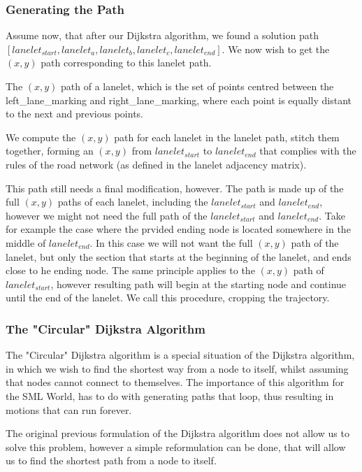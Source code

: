 \subsubsection{Generating the Path}

Assume now, that after our Dijkstra algorithm, we found a solution path $ [lanelet_{start},\allowbreak lanelet_{a},\allowbreak lanelet_{b},\allowbreak lanelet_{c},\allowbreak lanelet_{end}]$. We now wish to get the $(x,y)$ path corresponding to this lanelet path. 

The $(x,y)$ path of a lanelet, which is the set of points centred between the left\_lane\_marking and right\_lane\_marking, where each point is equally distant to the next and previous points.

We compute the $(x,y)$ path for each lanelet in the lanelet path, stitch them together, forming an $(x,y)$ from $lanelet_{start}$ to $lanelet_{end}$ that complies with the rules of the road network (as defined in the lanelet adjacency matrix).

This path still needs a final modification, however. The path is made up of the full $(x,y)$ paths of each lanelet, including the $lanelet_{start}$ and $lanelet_{end}$, however we might not need the full path of the $lanelet_{start}$ and $lanelet_{end}$. Take for example the case where the prvided ending node is located somewhere in the middle of $lanelet_{end}$. In this case we will not want the full $(x,y)$ path of the lanelet, but only the section that starts at the beginning of the lanelet, and ends close to he ending node. The same principle applies to the $(x,y)$ path of $lanelet_{start}$, however resulting path will begin at the starting node and continue until the end of the lanelet. We call this procedure, cropping the trajectory.

\subsubsection{The "Circular" Dijkstra Algorithm}

The "Circular" Dijkstra algorithm is a special situation of the Dijkstra algorithm, in which we wish to find the shortest way from a node to itself, whilst assuming that nodes cannot connect to themselves. The importance of this algorithm for the SML World, has to do with generating paths that loop, thus resulting in motions that can run forever.

The original previous formulation of the Dijkstra algorithm does not allow us to solve this problem, however a simple reformulation can be done, that will allow us to find the shortest path from a node to itself.


